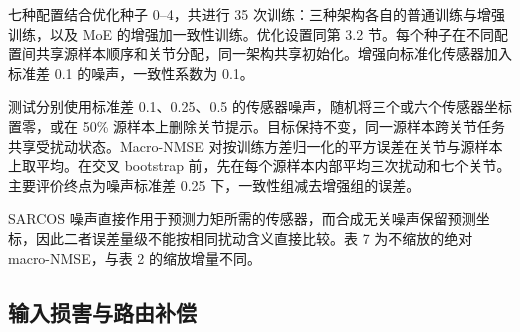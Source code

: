 \documentclass[10pt,letterpaper]{article}
\begin{document}
七种配置结合优化种子 0--4，共进行 35 次训练：三种架构各自的普通训练与增强训练，以及 MoE 的增强加一致性训练。优化设置同第 3.2 节。每个种子在不同配置间共享源样本顺序和关节分配，同一架构共享初始化。增强向标准化传感器加入标准差 0.1 的噪声，一致性系数为 0.1。


测试分别使用标准差 0.1、0.25、0.5 的传感器噪声，随机将三个或六个传感器坐标置零，或在 50\% 源样本上删除关节提示。目标保持不变，同一源样本跨关节任务共享受扰动状态。Macro-NMSE 对按训练方差归一化的平方误差在关节与源样本上取平均。在交叉 bootstrap 前，先在每个源样本内部平均三次扰动和七个关节。主要评价终点为噪声标准差 0.25 下，一致性组减去增强组的误差。


SARCOS 噪声直接作用于预测力矩所需的传感器，而合成无关噪声保留预测坐标，因此二者误差量级不能按相同扰动含义直接比较。表 7 为不缩放的绝对 macro-NMSE，与表 2 的缩放增量不同。


\begin{table}[!htbp]
\centering
\caption{五个种子上的 SARCOS macro-NMSE 均值。噪声标准差为 0.25；遮挡删除 21 个传感器坐标中的六个。切换率对应噪声标准差 0.25。破折号表示该率无定义：稠密网络没有专家路由器，因此不存在可切换的专家身份。}
\label{tab:results7}
\small
\setlength{\tabcolsep}{4pt}
\renewcommand{\arraystretch}{1.1}
\ifdim\wd\reporttablebox>\linewidth
\resizebox{\linewidth}{!}{\usebox{\reporttablebox}}
\else\usebox{\reporttablebox}\fi
\end{table}


\subsection{输入损害与路由补偿}
\end{document}
